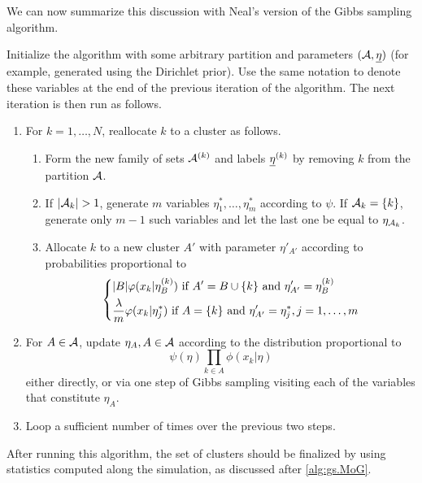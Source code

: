 We can now summarize this discussion with Neal's version of the Gibbs sampling algorithm. 
\begin{algorithm}[Neal]
\label{alg:dpm.posterior.neal}
Initialize the algorithm with some arbitrary partition and parameters $({\mathcal A}, {\underline{\eta}})$ (for example, generated using the Dirichlet prior). Use the same notation to denote these variables at the end of the previous iteration of the algorithm. The next iteration is then run as follows.
\begin{enumerate}[label=(\arabic*)]
\item For $k=1, \ldots, N$, reallocate $k$ to a cluster as follows.   
\begin{enumerate}[label=(\roman*), wide=0.5cm]
\item Form the new family of sets ${\mathcal A}^{(k)}$ and labels ${\underline{\eta}}^{(k)}$ by removing $k$ from the partition ${\mathcal A}$.
\item If $|{\mathcal A}_k| > 1$, generate $m$ variables $\eta^*_1, \ldots, \eta^*_m$ according to $\psi$. If ${\mathcal A}_k= \{k\}$, generate only $m-1$ such variables and let the last one be equal to $\eta_{{\mathcal A}_k}$.
\item Allocate $k$ to a new cluster $A'$ with parameter $\eta'_{A'}$ according to probabilities proportional to  
\[
\left\{
\begin{aligned}
& |B|  \varphi(x_k|\eta^{(k)}_B) \text{ if } A' = B \cup \{k\} \text{ and } \eta'_{A'} = \eta^{(k)}_B\\
&\frac{\lambda}{m}  \varphi(x_k|\eta^*_j) \text{ if } A = \{k\}  \text{ and }   \eta'_{A'}  = \eta^*_j, j=1, \ldots, m
\end{aligned}
\right.
\]
\end{enumerate}
\item For $A\in {\mathcal A}$, update $\eta_A, A\in {\mathcal A}$ according to the distribution proportional to
\[
\psi(\eta) \prod_{k\in A} \phi(x_k|\eta)
\]
either directly, or via one step of Gibbs sampling visiting each of the variables that constitute $\eta_A$.
\item Loop a sufficient number of times over the previous two steps.
\end{enumerate}
\end{algorithm}

After running this algorithm, the set of clusters should be finalized by using statistics computed along the simulation, as discussed after \cref{alg:gs.MoG}.
\bigskip

